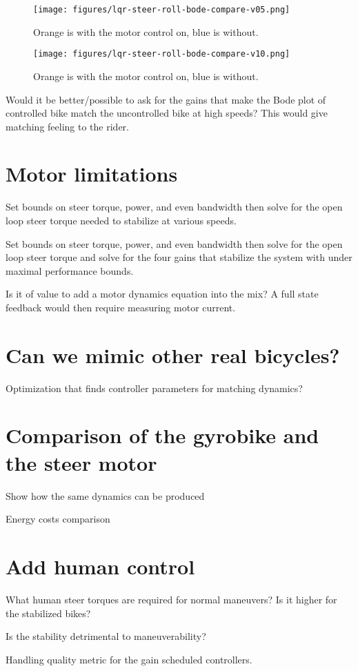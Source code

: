\documentclass[12pt]{article}
\begin{document}
\begin{figure}
  \centering
  \texttt{[image: figures/lqr-steer-roll-bode-compare-v05.png]}
  \caption{Orange is with the motor control on, blue is without.}
  \label{fig:lqr-steer-roll-bode-compare-v05}
\end{figure}

\begin{figure}
  \centering
  \texttt{[image: figures/lqr-steer-roll-bode-compare-v10.png]}
  \caption{Orange is with the motor control on, blue is without.}
  \label{fig:lqr-steer-roll-bode-compare-v10}
\end{figure}

Would it be better/possible to ask for the gains that make the Bode plot of
controlled bike match the uncontrolled bike at high speeds? This would give
matching feeling to the rider.

\section{Motor limitations}

Set bounds on steer torque, power, and even bandwidth then solve for the open
loop steer torque needed to stabilize at various speeds.

Set bounds on steer torque, power, and even bandwidth then solve for the open
loop steer torque and solve for the four gains that stabilize the system with
under maximal performance bounds.

Is it of value to add a motor dynamics equation into the mix? A full state
feedback would then require measuring motor current.

\section{Can we mimic other real bicycles?}

Optimization that finds controller parameters for matching dynamics?

\section{Comparison of the gyrobike and the steer motor}

Show how the same dynamics can be produced

Energy costs comparison

\section{Add human control}

What human steer torques are required for normal maneuvers? Is it higher for the
stabilized bikes?

Is the stability detrimental to maneuverability?

Handling quality metric for the gain scheduled controllers.



\end{document}
